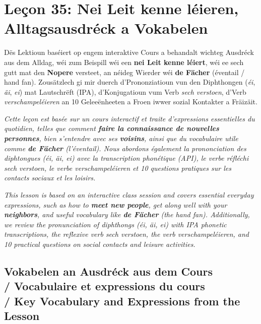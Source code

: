 \chapter[Leçon 35: Nei Leit kenne léieren \& Alltagsausdréck]{Leçon 35: Nei Leit kenne léieren, Alltagsausdréck a Vokabelen}

Dës Lektioun baséiert op engem interaktive Cours a behandalt wichteg Ausdréck aus dem Alldag, wéi zum Beispill wéi een \textbf{nei Leit kenne léiert}, wéi ee sech gutt mat den \textbf{Nopere} versteet, an néideg Wierder wéi \textbf{de Fächer} (éventail / hand fan). Zousätzlech gi mir duerch d'Prononziatioun vun den Diphthongen (\textit{éi}, \textit{äi}, \textit{ei}) mat Lautschrëft (IPA), d'Konjugatioun vum Verb \textit{sech verstoen}, d'Verb \textit{verschampeléieren} an 10 Geleeënheeten a Froen iwwer sozial Kontakter a Fräizäit.

\textit{Cette leçon est basée sur un cours interactif et traite d'expressions essentielles du quotidien, telles que comment \textbf{faire la connaissance de nouvelles personnes}, bien s'entendre avec ses \textbf{voisins}, ainsi que du vocabulaire utile comme \textbf{de Fächer} (l'éventail). Nous abordons également la prononciation des diphtongues (\textit{éi}, \textit{äi}, \textit{ei}) avec la transcription phonétique (API), le verbe réfléchi \textit{sech verstoen}, le verbe \textit{verschampeléieren} et 10 questions pratiques sur les contacts sociaux et les loisirs.}

\textit{This lesson is based on an interactive class session and covers essential everyday expressions, such as how to \textbf{meet new people}, get along well with your \textbf{neighbors}, and useful vocabulary like \textbf{de Fächer} (the hand fan). Additionally, we review the pronunciation of diphthongs (\textit{éi}, \textit{äi}, \textit{ei}) with IPA phonetic transcriptions, the reflexive verb \textit{sech verstoen}, the verb \textit{verschampeléieren}, and 10 practical questions on social contacts and leisure activities.}

\vspace{1.5em}

\section[Vokabelen an Ausdréck / Vocabulary \& Expressions]{Vokabelen an Ausdréck aus dem Cours \\/ Vocabulaire et expressions du cours \\/ Key Vocabulary and Expressions from the Lesson}

